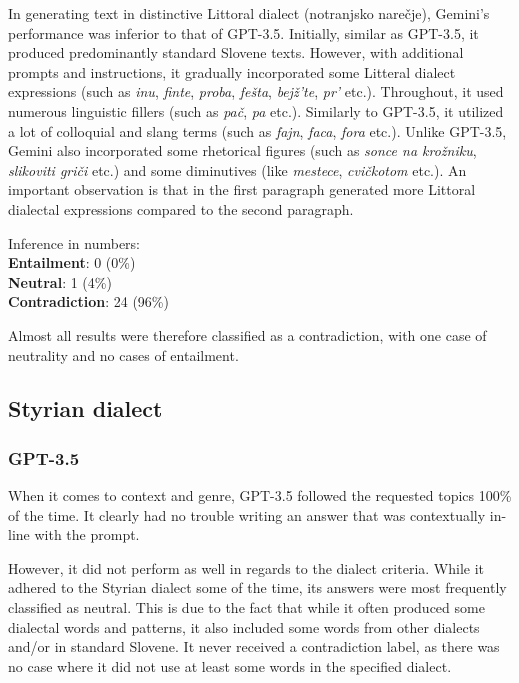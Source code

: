 \documentclass[fleqn,moreauthors,10pt]{ds_report}
\begin{document}
    In generating text in distinctive Littoral dialect (notranjsko narečje), Gemini's performance was inferior to that of GPT-3.5. Initially, similar as GPT-3.5, it produced predominantly standard Slovene texts. However, with additional prompts and instructions, it gradually incorporated some Litteral dialect expressions (such as \textit{inu}, \textit{finte}, \textit{proba}, \textit{fešta}, \textit{bejž'te}, \textit{pr' }etc.). Throughout, it used numerous linguistic fillers (such as \textit{pač}, \textit{pa} etc.). Similarly to GPT-3.5, it utilized a lot of colloquial and slang terms (such as \textit{fajn}, \textit{faca}, \textit{fora} etc.). Unlike GPT-3.5, Gemini also incorporated some rhetorical figures (such as \textit{sonce na krožniku}, \textit{slikoviti griči} etc.) and some diminutives (like \textit{mestece}, \textit{cvičkotom} etc.). An important observation is that in the first paragraph generated more Littoral  dialectal expressions compared to the second paragraph. 

    \vspace{\baselineskip}
Inference in numbers:
\n\\ \textbf{Entailment}: 0 (0\%)
\textbf{\n\\Neutral}: 1 (4\%)
\textbf{\n\\Contradiction}: 24 (96\%)

\vspace{\baselineskip}
Almost all results were therefore classified as a contradiction, with one case of neutrality and no cases of entailment.
    
\subsection{Styrian dialect}
\vspace{\baselineskip}
\subsubsection{GPT-3.5}

    When it comes to context and genre, GPT-3.5 followed the requested topics 100\% of the time. It clearly had no trouble writing an answer that was contextually in-line with the prompt.

    However, it did not perform as well in regards to the dialect criteria. While it adhered to the Styrian dialect some of the time, its answers were most frequently classified as neutral. This is due to the fact that while it often produced some dialectal words and patterns, it also included some words from other dialects and/or in standard Slovene. It never received a contradiction label, as there was no case where it did not use at least some words in the specified dialect. 
\end{document}
